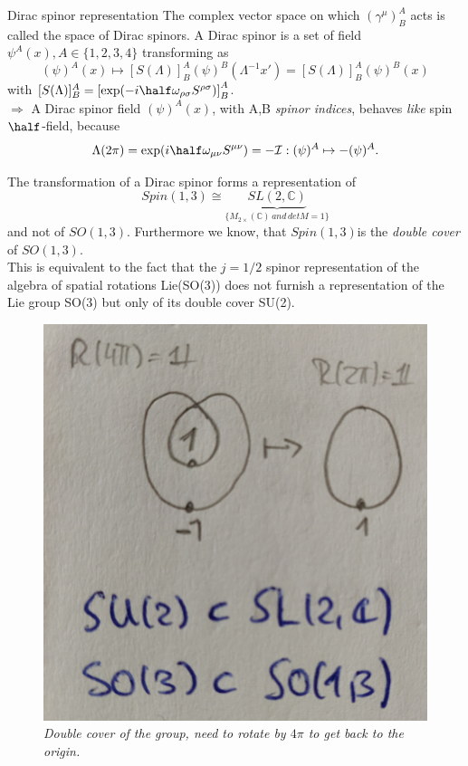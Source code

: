 \begin{mybox}{Dirac spinor representation}
	The complex vector space on which $(\gamma^{\mu})^A_B$ acts is called the space of Dirac spinors. A Dirac spinor is a set of field $\psi^A(x), A\in \{1,2,3,4\}$ transforming as
	\begin{equation}
		(\psi)^A(x) \mapsto [S(\Lambda)]^A_B (\psi)^B (\Lambda^{-1} x') = [S(\Lambda)]^A_B (\psi)^B(x) 
	\end{equation}
	with $[S(\Lambda)]^A_B = \left[\exp(-i \half \omega_{\rho \sigma} S^{\rho \sigma} )\right]^A_B$.\\
	$\Rightarrow$ A Dirac spinor field $(\psi)^A(x)$, with A,B \emph{spinor indices}, behaves \emph{like} spin $\half$-field, because
	\begin{equation}
		\Lambda(2 \pi) = \exp(i \half \omega_{\mu \nu} S^{\mu \nu} ) = - \mathcal{I}: (\psi)^A \mapsto -(\psi)^A.
	\end{equation}
\end{mybox}
The transformation of a Dirac spinor forms a representation of
\begin{equation}
	Spin(1,3) \cong \underbrace{SL(2, \mathbb{C})}_{\{M_{2 \times} (\mathbb{C}) \, and \, detM=1 \} }
\end{equation}
and not of $SO(1,3)$. Furthermore we know, that $Spin(1,3)$is the  \emph{double cover} of $SO(1,3)$.\\
This is equivalent to the fact that the $j=1/2$ spinor representation of the algebra of spatial rotations Lie(SO(3)) does not furnish a representation of the Lie group SO(3) but only of its double cover SU(2).\\
\begin{figure}[h]
	\centering
	\includegraphics[width=0.7\linewidth]{gfx/doublecoverDiracSpinor}
	\caption{\itshape Double cover of the group, need to rotate by $4\pi$ to get back to the origin.}
	\label{fig:doublecoverdiracspinor}
\end{figure}

